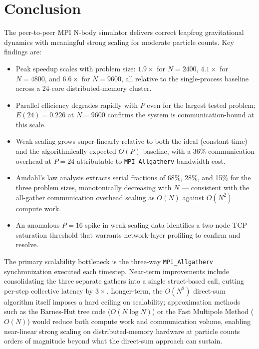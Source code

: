 \documentclass[11pt]{article}
\begin{document}
\section{Conclusion}

The peer-to-peer MPI N-body simulator delivers correct leapfrog gravitational dynamics with meaningful strong scaling for moderate particle counts. Key findings are:

\begin{itemize}
  \item Peak speedup scales with problem size: $1.9\times$ for $N = 2400$, $4.1\times$ for $N = 4800$, and $6.6\times$ for $N = 9600$, all relative to the single-process baseline across a 24-core distributed-memory cluster.
  \item Parallel efficiency degrades rapidly with $P$ even for the largest tested problem; $E(24) = 0.226$ at $N = 9600$ confirms the system is communication-bound at this scale.
  \item Weak scaling grows super-linearly relative to both the ideal (constant time) and the algorithmically expected $O(P)$ baseline, with a 36\% communication overhead at $P = 24$ attributable to \texttt{MPI\_Allgatherv} bandwidth cost.
  \item Amdahl's law analysis extracts serial fractions of 68\%, 28\%, and 15\% for the three problem sizes, monotonically decreasing with $N$ — consistent with the all-gather communication overhead scaling as $O(N)$ against $O(N^2)$ compute work.
  \item An anomalous $P = 16$ spike in weak scaling data identifies a two-node TCP saturation threshold that warrants network-layer profiling to confirm and resolve.
\end{itemize}

The primary scalability bottleneck is the three-way \texttt{MPI\_Allgatherv} synchronization executed each timestep. Near-term improvements include consolidating the three separate gathers into a single struct-based call, cutting per-step collective latency by $3\times$. Longer-term, the $O(N^2)$ direct-sum algorithm itself imposes a hard ceiling on scalability; approximation methods such as the Barnes-Hut tree code ($O(N \log N)$) or the Fast Multipole Method ($O(N)$) would reduce both compute work and communication volume, enabling near-linear strong scaling on distributed-memory hardware at particle counts orders of magnitude beyond what the direct-sum approach can sustain.
\end{document}
